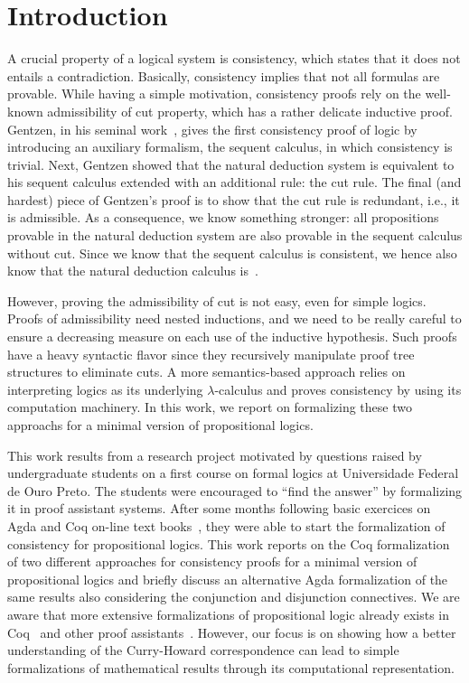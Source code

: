 \begin{coqdoccode}
\coqdocemptyline
\coqdocemptyline
\end{coqdoccode}
\section{Introduction}


A crucial property of a logical system is consistency, which states that it does not
entails a contradiction. Basically, consistency implies that not all formulas
are provable.  While having a simple motivation, consistency proofs rely on
the well-known admissibility of cut property, which has a rather delicate inductive proof.
Gentzen, in his seminal work~\cite{Gentzen36}, gives the first consistency proof of logic by introducing an
auxiliary formalism, the sequent calculus, in which consistency is trivial. Next, Gentzen showed
that the natural deduction system is equivalent to his sequent calculus extended with an
additional rule: the cut rule. The final (and hardest) piece of Gentzen's proof is to 
show that the cut rule is redundant, i.e., it is admissible. As a consequence, we know
something stronger: all propositions provable in the natural deduction system are also provable
in the sequent calculus without cut. Since we know that the sequent calculus is consistent,
we hence also know that the natural deduction calculus is~\cite{Negri2001}.


However, proving the admissibility of cut is not easy, even for simple logics.
Proofs of admissibility need nested inductions, and we need to be really careful to
ensure a decreasing measure on each use of the inductive hypothesis. Such proofs have
a heavy syntactic flavor since they recursively manipulate proof tree structures to
eliminate cuts. A more semantics-based approach relies on interpreting logics as its
underlying $\lambda$-calculus and proves consistency by using its computation machinery.
In this work, we report on formalizing these two approachs for a minimal version of
propositional logics.


This work results from a research project motivated by questions raised by
undergraduate students on a first course on formal logics at Universidade Federal de Ouro Preto.
The students were encouraged to ``find the answer'' by formalizing it in proof assistant systems.
After some months following basic exercices on Agda and Coq on-line text books~\cite{plfa2019,Pierce18},
they were able to start the formalization of consistency for propositional logics. This work reports on
the Coq formalization of two different approaches for consistency proofs for a minimal version of
propositional logics and briefly discuss an alternative Agda formalization of the same results also considering
the conjunction and disjunction connectives. We are aware that more extensive formalizations of propositional logic already
exists in Coq~\cite{doorn2015} and other proof assistants~\cite{Nipkow17}. However, our focus is
on showing how a better understanding of the Curry-Howard correspondence can lead to simple formalizations
of mathematical results through its computational representation.


